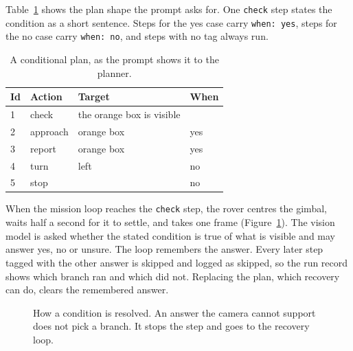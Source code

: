 Table~\ref{tab:cond_plan} shows the plan shape the prompt asks for. One
\texttt{check} step states the condition as a short sentence. Steps for the yes
case carry \texttt{when: yes}, steps for the no case carry \texttt{when: no}, and
steps with no tag always run.

\begin{table}[htbp]
  \centering
  \caption{A conditional plan, as the prompt shows it to the planner.}
  \label{tab:cond_plan}
  \small
  \begin{tabular}{@{}l l l l@{}}
    \toprule
    Id & Action & Target & When \\
    \midrule
    1 & check & the orange box is visible & \\
    2 & approach & orange box & yes \\
    3 & report & orange box & yes \\
    4 & turn & left & no \\
    5 & stop & & no \\
    \bottomrule
  \end{tabular}
\end{table}

When the mission loop reaches the \texttt{check} step, the rover centres the
gimbal, waits half a second for it to settle, and takes one frame
(Figure~\ref{fig:cond}). The vision model is asked whether the stated condition is
true of what is visible and may answer yes, no or unsure. The loop remembers the
answer. Every later step tagged with the other answer is skipped and logged as
skipped, so the run record shows which branch ran and which did not. Replacing the
plan, which recovery can do, clears the remembered answer.

\begin{figure}[htbp]
  \centering
  \caption{How a condition is resolved. An answer the camera cannot support does not pick a branch. It stops the step and goes to the recovery loop.}
  \label{fig:cond}
\end{figure}

